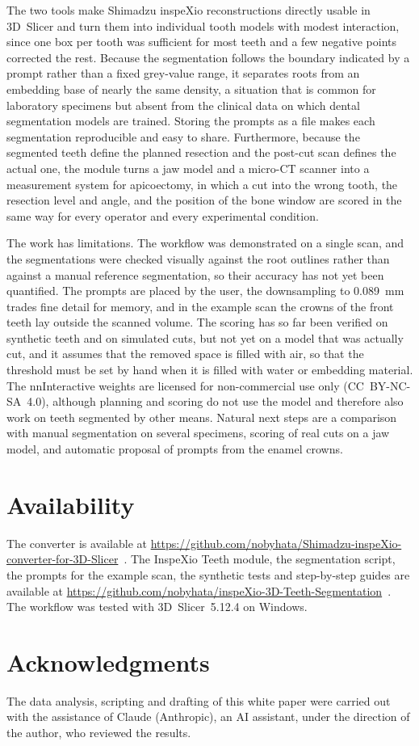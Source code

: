 \documentclass[11pt,a4paper]{article}
\begin{document}
The two tools make Shimadzu inspeXio reconstructions directly usable in 3D~Slicer and turn them into individual tooth models with modest interaction, since one box per tooth was sufficient for most teeth and a few negative points corrected the rest. Because the segmentation follows the boundary indicated by a prompt rather than a fixed grey-value range, it separates roots from an embedding base of nearly the same density, a situation that is common for laboratory specimens but absent from the clinical data on which dental segmentation models are trained. Storing the prompts as a file makes each segmentation reproducible and easy to share. Furthermore, because the segmented teeth define the planned resection and the post-cut scan defines the actual one, the module turns a jaw model and a micro-CT scanner into a measurement system for apicoectomy, in which a cut into the wrong tooth, the resection level and angle, and the position of the bone window are scored in the same way for every operator and every experimental condition.

The work has limitations. The workflow was demonstrated on a single scan, and the segmentations were checked visually against the root outlines rather than against a manual reference segmentation, so their accuracy has not yet been quantified. The prompts are placed by the user, the downsampling to \SI{0.089}{\milli\metre} trades fine detail for memory, and in the example scan the crowns of the front teeth lay outside the scanned volume. The scoring has so far been verified on synthetic teeth and on simulated cuts, but not yet on a model that was actually cut, and it assumes that the removed space is filled with air, so that the threshold must be set by hand when it is filled with water or embedding material. The nnInteractive weights are licensed for non-commercial use only (CC~BY-NC-SA~4.0), although planning and scoring do not use the model and therefore also work on teeth segmented by other means. Natural next steps are a comparison with manual segmentation on several specimens, scoring of real cuts on a jaw model, and automatic proposal of prompts from the enamel crowns.

\section{Availability}

The converter is available at \url{https://github.com/nobyhata/Shimadzu-inspeXio-converter-for-3D-Slicer}~\cite{repoConverter}. The InspeXio Teeth module, the segmentation script, the prompts for the example scan, the synthetic tests and step-by-step guides are available at \url{https://github.com/nobyhata/inspeXio-3D-Teeth-Segmentation}~\cite{repoSegmentation}. The workflow was tested with 3D~Slicer~5.12.4 on Windows.

\section*{Acknowledgments}

The data analysis, scripting and drafting of this white paper were carried out with the assistance of Claude (Anthropic), an AI assistant, under the direction of the author, who reviewed the results.



\end{document}

